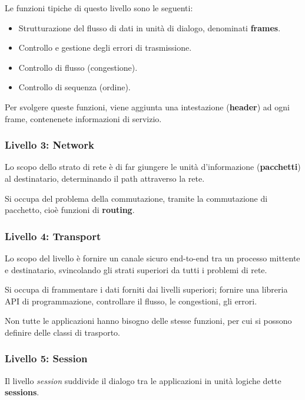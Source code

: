             Le funzioni tipiche di questo livello sono le seguenti:
            \begin{itemize}
                \item Strutturazione del flusso di dati in unità di dialogo, denominati \textbf{frames}.
                \item Controllo e gestione degli errori di trasmissione.
                \item Controllo di flusso (congestione).
                \item Controllo di sequenza (ordine).
            \end{itemize} 

            Per svolgere queste funzioni, viene aggiunta una intestazione (\textbf{header}) ad ogni frame, contenenete informazioni di servizio.
        
        \subsubsection{Livello 3: Network}
            Lo scopo dello strato di rete è di far giungere le unità d'informazione (\textbf{pacchetti}) al destinatario, determinando il path attraverso la rete.

            Si occupa del problema della commutazione, tramite la commutazione di pacchetto, cioè funzioni di \textbf{routing}.

        \subsubsection{Livello 4: Transport}
            Lo scopo del livello è fornire un canale sicuro end-to-end tra un processo mittente e destinatario, svincolando gli strati superiori da tutti i problemi di rete.

            Si occupa di frammentare i dati forniti dai livelli superiori; fornire una libreria API di programmazione, controllare il flusso, le congestioni, gli errori.

            Non tutte le applicazioni hanno bisogno delle stesse funzioni, per cui si possono definire delle classi di trasporto.

        \subsubsection{Livello 5: Session}
            Il livello \textit{session} suddivide il dialogo tra le applicazioni in unità logiche dette \textbf{sessions}.
        
